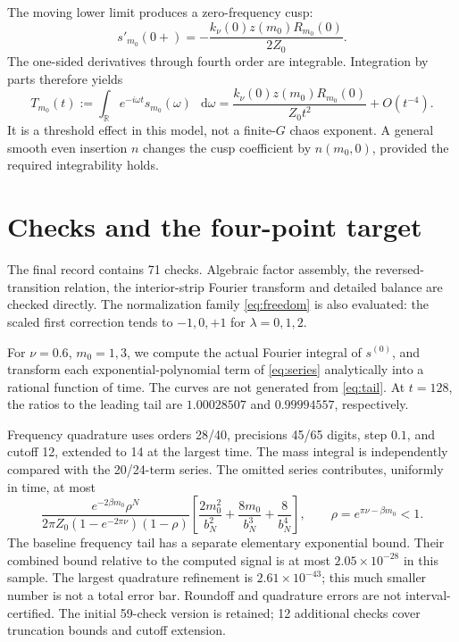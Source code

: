 \documentclass[11pt,a4paper]{article}
\newcommand{\dd}{\mathop{}\!\mathrm d}
\begin{document}
The moving lower limit produces a zero-frequency cusp:
\[
s'_{m_0}(0+)=-\frac{k_\nu(0)z(m_0)R_{m_0}(0)}{2Z_0}.
\]
The one-sided derivatives through fourth order are integrable.
Integration by parts therefore yields
\begin{equation}
T_{m_0}(t):=\int_{\mathbb R}e^{-i\omega t}s_{m_0}(\omega)\,\dd\omega
=\frac{k_\nu(0)z(m_0)R_{m_0}(0)}{Z_0t^2}+O(t^{-4}).
\label{eq:tail}
\end{equation}
It is a threshold effect in this model, not a finite-\(G\)
chaos exponent. A general smooth even insertion \(n\) changes
the cusp coefficient by \(n(m_0,0)\), provided the required
integrability holds.

\section{Checks and the four-point target}
The final record contains 71 checks. Algebraic factor assembly,
the reversed-transition relation, the interior-strip Fourier
transform and detailed balance are checked directly.
The normalization family \eqref{eq:freedom} is also evaluated:
the scaled first correction tends to \(-1,0,+1\) for
\(\lambda=0,1,2\).

For \(\nu=0.6\), \(m_0=1,3\), we compute the actual Fourier
integral of \(s^{(0)}\), and transform each exponential-polynomial
term of \eqref{eq:series} analytically into a rational function
of time. The curves are not generated from \eqref{eq:tail}.
At \(t=128\), the ratios to the leading tail are
\(1.00028507\) and \(0.99994557\), respectively.

Frequency quadrature uses orders 28/40, precisions 45/65 digits,
step \(0.1\), and cutoff 12, extended to 14 at the largest time.
The mass integral is independently compared with the 20/24-term
series. The omitted series contributes, uniformly in time, at most
\begin{equation}
\frac{e^{-2\beta m_0}\rho^N}
{2\pi Z_0(1-e^{-2\pi\nu})(1-\rho)}
\left[\frac{2m_0^2}{b_N^2}+\frac{8m_0}{b_N^3}+\frac8{b_N^4}\right],
\qquad \rho=e^{\pi\nu-\beta m_0}<1.
\end{equation}
The baseline frequency tail has a separate elementary exponential
bound. Their combined bound relative to the computed signal is
at most \(2.05\times10^{-28}\) in this sample.
The largest quadrature refinement is \(2.61\times10^{-43}\);
this much smaller number is not a total error bar.
Roundoff and quadrature errors are not interval-certified.
The initial 59-check version is retained; 12 additional checks
cover truncation bounds and cutoff extension.
\end{document}
